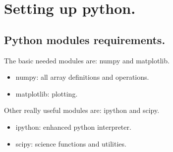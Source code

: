 \documentclass[a4paper,12pt]{article}
\begin{document}
%
%

    
\section{Setting up python.}
\subsection{Python modules requirements.}
The basic needed modules are: numpy and matplotlib.
\begin{itemize}
 \item numpy: all array definitions and operations.
  \item matplotlib: plotting.
\end{itemize}

Other really useful modules are: ipython and scipy.

\begin{itemize}
 \item ipython: enhanced python interpreter.
  \item scipy: science functions and utilities.
\end{itemize}
\end{document}
